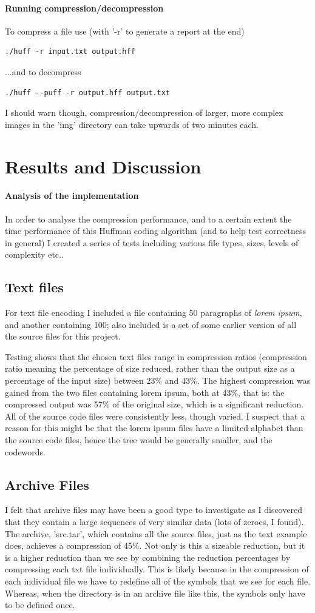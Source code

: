 \documentclass[]{article}
\begin{document}
\paragraph{Running compression/decompression}
To compress a file use (with '-r' to generate a report at the end)
\begin{lstlisting}
./huff -r input.txt output.hff
\end{lstlisting}
...and to decompress
\begin{lstlisting}
./huff --puff -r output.hff output.txt
\end{lstlisting}
I should warn though, compression/decompression of larger, more complex images in the 'img' directory can take upwards of two minutes each.
\section{Results and Discussion}
\paragraph{Analysis of the implementation} In order to analyse the compression performance, and to a certain extent the time performance of this Huffman coding algorithm (and to help test correctness in general) I created a series of tests including various file types, sizes, levels of complexity etc..
\subsection{Text files} For text file encoding I included a file containing 50 paragraphs of \emph{lorem ipsum}, and another containing 100; also included is a set of some earlier version of all the source files for this project.

Testing shows that the chosen text files range in compression ratios (compression ratio meaning the percentage of size reduced, rather than the output size as a percentage of the input size) between 23\% and 43\%. The highest compression was gained from the two files containing lorem ipsum, both at 43\%, that is: the compressed output was 57\% of the original size, which is a significant reduction. All of the source code files were consistently less, though varied. I suspect that a reason for this might be that the lorem ipsum files have a limited alphabet than the source code files, hence the tree would be generally smaller, and the codewords.
\subsection{Archive Files} I felt that archive files may have been a good type to investigate as I discovered that they contain a large sequences of very similar data (lots of zeroes, I found). The archive, 'src.tar', which contains all the source files, just as the text example does, achieves a compression of 45\%. Not only is this a sizeable reduction, but it is a higher reduction than we see by combining the reduction percentages by compressing each txt file individually. This is likely because in the compression of each individual file we have to redefine all of the symbols that we see for each file. Whereas, when the directory is in an archive file like this, the symbols only have to be defined once.
\end{document}
